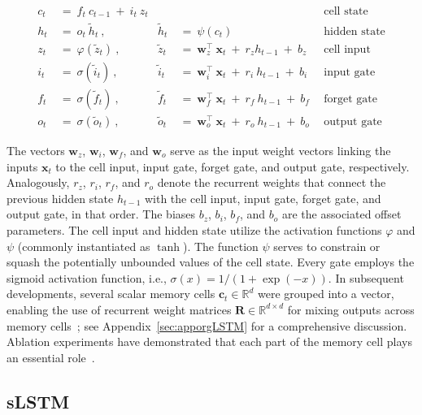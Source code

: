 \begin{align}
c_t \ &= \  f_t \ c_{t-1} \ + \ i_t \ z_t &  & &\text{cell state} \\
h_t  \ &= \ o_t \ \tilde{h}_t \ , & \tilde{h}_t \ &= \ \psi \left( c_t\right)
  &\text{hidden state} \\
z_t \ &= \ \varphi \left( \tilde{z}_t \right) \ , 
  &\tilde{z}_t \ &=  \ \mathbf{w}^\top_{z} \ \mathbf{x}_t \ + \
  r_{z}  h_{t-1} \ + \  b_{z} \ \
  &\text{cell input} \\
i_t \ &= \ \sigma \left( \tilde{i}_t  \right) \ , 
  &\tilde{i}_t \ &= \ \mathbf{w}^\top_{i} \ \mathbf{x}_t \ + \
  r_{i}  \ h_{t-1} \ + \  b_{i} \ \
  &\text{input gate} \\
f_t \ &= \ \sigma \left(  \tilde{f}_t \right) \ , 
  &\tilde{f}_t \ &= \ \mathbf{w}^\top_{f} \ \mathbf{x}_t  \ + \
  r_{f}  \ h_{t-1} \ + \  b_{f} \ \
  &\text{forget gate} \\
o_t \ &= \ \sigma \left( \tilde{o}_t \right) \ , 
  &\tilde{o}_t  \ &= \ \mathbf{w}^\top_{o} \ \mathbf{x}_t \ + \
  r_{o}  \ h_{t-1} \ + \  b_{o} \ \
  &\text{output gate} 
\end{align}

The vectors $\mathbf{w}_{z}$, $\mathbf{w}_{i}$, $\mathbf{w}_{f}$, and $\mathbf{w}_{o}$ serve as the input weight vectors linking the inputs $\mathbf{x}_t$ to the cell input, input gate, forget gate, and output gate, respectively. Analogously, $r_{z}$, $r_{i}$, $r_{f}$, and $r_{o}$ denote the recurrent weights that connect the previous hidden state $h_{t-1}$ with the cell input, input gate, forget gate, and output gate, in that order. The biases $b_{z}$, $b_{i}$, $b_{f}$, and $b_{o}$ are the associated offset parameters. The cell input and hidden state utilize the activation functions $\varphi$ and $\psi$ (commonly instantiated as $\tanh$). The function $\psi$ serves to constrain or squash the potentially unbounded values of the cell state. Every gate employs the sigmoid activation function, i.e., $\sigma \left( x \right)= 1/(1+\exp(-x))$. In subsequent developments, several scalar memory cells $\mathbf{c}_t \in \mathbb{R}^{d}$ were grouped into a vector, enabling the use of recurrent weight matrices $\mathbf{R} \in \mathbb{R}^{d \times d}$ for mixing outputs across memory cells~\citep{Greff:15}; see Appendix~\ref{sec:apporgLSTM} for a comprehensive discussion. Ablation experiments have demonstrated that each part of the memory cell plays an essential role~\citep{Greff:15}.

\subsection{sLSTM}
\label{sec:sLSTM}

